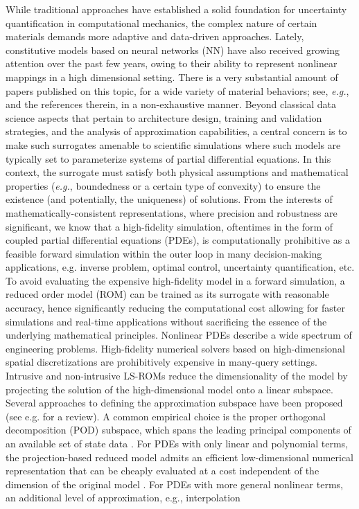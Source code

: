While traditional approaches have established a solid foundation for uncertainty quantification in computational mechanics, the complex nature of certain materials demands more adaptive and data-driven approaches. Lately, constitutive models based on neural networks (NN) have also received growing attention over the past few years, owing to their ability to represent nonlinear mappings in a high dimensional setting. There is a very substantial amount of papers published on this topic, for a wide variety of material behaviors; see, \textit{e.g.},  \cite{flaschel2021unsupervised,xu2021learning,holzapfel2021predictive,jung2006neural,ghaboussi1998autoprogressive,ghaboussi1998new,hashash2004numerical,furukawa1998implicit,joshi2022bayesian,as2022mechanics,Asad-IJNME,KLEIN2022104703} and the references therein, in a non-exhaustive manner. Beyond classical data science aspects that pertain to architecture design, training and validation strategies, and the analysis of approximation capabilities, a central concern is to make such surrogates amenable to scientific simulations where such models are typically set to parameterize systems of partial differential equations. In this context, the surrogate must satisfy both physical assumptions and mathematical properties (\textit{e.g.}, boundedness or a certain type of convexity) to ensure the existence (and potentially, the uniqueness) of solutions. From the interests of mathematically-consistent representations, where precision and robustness are significant, we know that a high-fidelity simulation, oftentimes in the form of coupled partial differential equations (PDEs), is computationally prohibitive as a feasible forward simulation within the outer loop in many decision-making applications, e.g. inverse problem, optimal control, uncertainty quantification, etc. To avoid evaluating the expensive high-fidelity model in a forward simulation, a reduced order model (ROM) can be trained as its surrogate with reasonable accuracy, hence significantly reducing the computational cost allowing for faster simulations and real-time applications without sacrificing the essence of the underlying mathematical principles. Nonlinear PDEs describe a wide spectrum of engineering problems. High-fidelity numerical solvers based on high-dimensional spatial discretizations are prohibitively expensive in many-query settings. Intrusive and non-intrusive LS-ROMs reduce the dimensionality of the model by projecting the solution of the high-dimensional model onto a linear subspace. Several approaches to defining the approximation subspace have been proposed (see e.g. \cite{benner2015survey} for a review). A common empirical choice is the proper orthogonal decomposition (POD) subspace, which spans the leading principal components of an available set of state data \cite{berkooz1993proper,lumley1967structure,sirovich1987turbulence}. For PDEs with only linear and polynomial terms, the projection-based reduced model admits an efficient low-dimensional numerical representation that can be cheaply evaluated at a cost independent of the dimension of the original model \cite{benner2015two,benner2015survey,cuong2005certified,goyal2016algebraic,hesthaven2016certified}. For PDEs with more general nonlinear terms, an additional level of approximation, e.g., interpolation 
